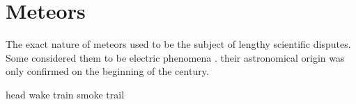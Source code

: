 \section{Meteors} \label{al}
    The exact nature of meteors used to be the subject of lengthy scientific disputes.
    Some considered them to be electric phenomena \citep{???}.
    their astronomical origin was only confirmed on the beginning of the  century.

    head
    wake
    train
    smoke trail
